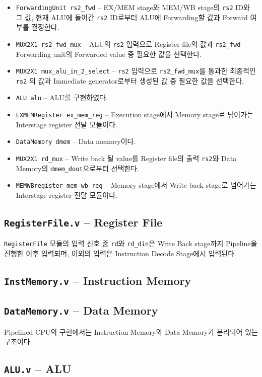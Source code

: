 \documentclass{scrartcl}
\begin{document}
\begin{itemize}
  \item \texttt{ForwardingUnit rs2\_fwd} -- EX/MEM stage와 MEM/WB stage의 \texttt{rs2} ID와 그 값, 현재 ALU에 들어간 \texttt{rs2} ID로부터 ALU에 Forwarding할 값과 Forward 여부를 결정한다.
  \item \texttt{MUX2X1 rs2\_fwd\_mux} -- ALU의 \texttt{rs2} 입력으로 Register file의 값과 \texttt{rs2\_fwd} Forwarding unit의 Forwarded value 중 필요한 값을 선택한다.
  \item \texttt{MUX2X1 mux\_alu\_in\_2\_select} -- \texttt{rs2} 입력으로 \texttt{rs2\_fwd\_mux}를 통과한 최종적인 \texttt{rs2} 의 값과 Immediate generator로부터 생성된 값 중 필요한 값을 선택한다.
  \item \texttt{ALU alu} -- ALU를 구현하였다.
  \item \texttt{EXMEMRegister ex\_mem\_reg} -- Execution stage에서 Memory stage로 넘어가는 Interstage register 전달 모듈이다.
  \item \texttt{DataMemory dmem} -- Data memory이다.
  \item \texttt{MUX2X1 rd\_mux} -- Write back 될 value를 Register file의 출력 \texttt{rs2}와 Data Memory의 \texttt{dmem\_dout}으로부터 선택한다.
  \item \texttt{MEMWBregister mem\_wb\_reg} -- Memory stage에서 Write back stage로 넘어가는 Interstage register 전달 모듈이다.
\end{itemize}

\subsection{\texttt{RegisterFile.v} -- Register File}
\texttt{RegisterFile} 모듈의 입력 신호 중 \texttt{rd}와 \texttt{rd\_din}은 Write Back stage까지 Pipeline을 진행한 이후 입력되며, 이외의 입력은 Instruction Decode Stage에서 입력된다.

\subsection{\texttt{InstMemory.v} -- Instruction Memory}
\subsection{\texttt{DataMemory.v} -- Data Memory}
Pipelined CPU의 구현에서는 Instruction Memory와 Data Memory가 분리되어 있는 구조이다.

\subsection{\texttt{ALU.v} -- ALU}
\end{document}
